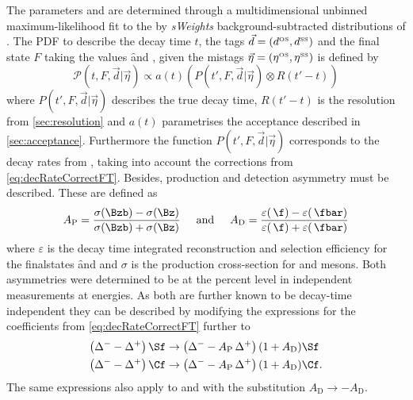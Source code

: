 The \CP parameters \Sf and \Sfbar are determined through a multidimensional unbinned maximum-likelihood fit to the by \emph{sWeights} background-subtracted distributions of \BdToDpi.
The PDF to describe the decay time $t$, the tags $\vec{d}=(d^{\text{\tiny OS}}, d^{\text{\tiny SS}})$ and the final state $F$ taking the values \f and \fbar, given the mistags $\vec{\eta}=(\eta^{\text{\tiny OS}}, \eta^{\text{\tiny SS}})$ is defined by
\begin{equation}
\mathcal{P}(t, F, \vec{d}|\vec{\eta})\propto a(t)\left(P(t', F, \vec{d}|\vec{\eta})\otimes R(t'-t)\right)\label{eq:FinalDecayTimePDF}
\end{equation}
where $P(t', F, \vec{d}|\vec{\eta})$ describes the true decay time, $R(t'-t)$ is the resolution from \cref{sec:resolution} and $a(t)$ parametrises the acceptance described in \cref{sec:acceptance}.
Furthermore the function $P(t', F, \vec{d}|\vec{\eta})$ corresponds to the decay rates from , taking into account the corrections from \cref{eq:decRateCorrectFT}.
Besides, production and detection asymmetry must be described.
These are defined as
\begin{equation}
A_{\text{P}}=\frac{\sigma(\Bzb)-\sigma(\Bz)}{\sigma(\Bzb)+\sigma(\Bz)}\hspace{0.5cm}\text{and}\hspace{0.5cm}A_{\text{D}}=\frac{\varepsilon(\,\f)-\varepsilon(\,\fbar)}{\varepsilon(\,\f)+\varepsilon(\,\fbar)}
\end{equation}
where $\varepsilon$ is the decay time integrated reconstruction and selection efficiency for the finalstates \f and \fbar and $\sigma$ is the production cross-section for \Bz and \Bzb mesons.
Both asymmetries were determined to be at the percent level in independent measurements at \lhc energies.
As both are further known to be decay-time independent they can be described by modifying the expressions for the \CP coefficients from \cref{eq:decRateCorrectFT} further to
\begin{equation}
\begin{aligned}
\left(\Delta^--\Delta^+\right)\Sf&\to\left(\Delta^--A_{\text{P}}\,\Delta^+\right)(1+A_{\text{D}})\Sf\\
\left(\Delta^--\Delta^+\right)\Cf&\to\left(\Delta^--A_{\text{P}}\,\Delta^+\right)(1+A_{\text{D}})\Cf.
\end{aligned}
\end{equation}
The same expressions also apply to \Sfbar and \Cfbar with the substitution $A_{\text{D}}\to -A_{\text{D}}$.

